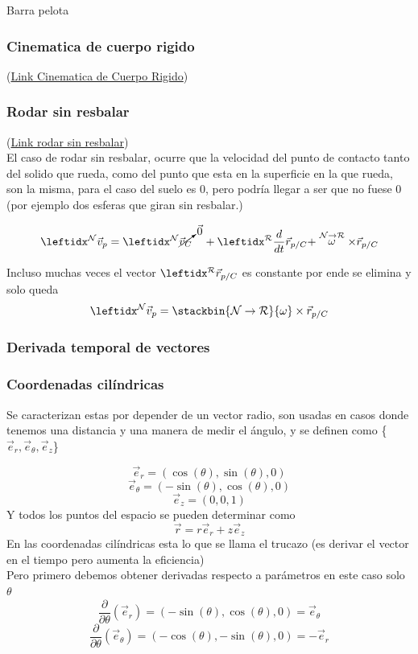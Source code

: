 \begin{solucion}{Barra pelota}
\begin{resumen}
\subsubsection*{Cinematica de cuerpo rigido}
(\href{https://dynref.engr.illinois.edu/rkg.html\#rkg-er}{Link Cinematica de Cuerpo Rigido})
\subsubsection*{Rodar sin resbalar}
(\href{https://dynref.engr.illinois.edu/rko.html\#rko-wr}{Link rodar sin resbalar})\\


El caso de rodar sin resbalar, ocurre que la velocidad del punto de contacto tanto del solido que rueda, como del punto que esta en la superficie en la que rueda, son la misma, para el caso del suelo es 0, pero podría llegar a ser que no fuese 0 (por ejemplo dos esferas que giran sin resbalar.) 


$$\marc{\vec{v}_p}{N}=\marc{\cancelto{\vec{0}}{\vec{v}_C}}{N} \quad+ \transporta{\vec{r}_{p/C}}{N}{R}$$

Incluso muchas veces el vector $\marc{\vec{r}_{p/C}}{R}$ es constante por ende se elimina y solo queda
$$\marc{\vec{v}_p}{N}=\stackbin{\mathcal{N}\to \mathcal{R}}{\omega}\times \vec{r}_{p/C}$$
\subsubsection*{Derivada temporal de vectores}

\subsubsection*{Coordenadas cilíndricas}
Se caracterizan estas por depender de un vector radio, son usadas en casos donde tenemos una distancia y una manera de medir el ángulo, y se definen como \{$\vec{e}_r,\vec{e}_{\theta},\vec{e}_z$\}

$$\vec{e}_r=(\cos(\theta),\sin(\theta),0)$$
$$\vec{e}_{\theta}=(-\sin(\theta),\cos(\theta),0)$$
$$\vec{e}_z=(0,0,1)$$
Y todos los puntos del espacio se pueden determinar como
$$\vec{r}=r\vec{e}_r+z\vec{e}_z$$
En las coordenadas cilíndricas esta lo que se llama el trucazo (es derivar el vector en el tiempo pero aumenta la eficiencia)\\
Pero primero debemos obtener derivadas respecto a parámetros en este caso solo $\theta$
$$\dfrac{\partial}{\partial\theta}(\vec{e}_r)=(-\sin(\theta),\cos(\theta),0)=\vec{e}_{\theta}$$
$$\dfrac{\partial}{\partial\theta}(\vec{e}_{\theta})=(-\cos(\theta),-\sin(\theta),0)=-\vec{e}_r$$


\end{resumen}
\end{solucion}
